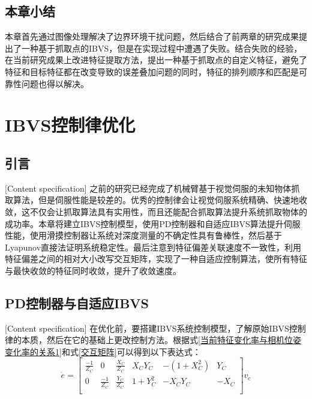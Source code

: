 \documentclass[fontset=fandol,type=bachelor,campus=harbin,bsmainpagenumberline=true]{hithesisbook}
\begin{document}
\section{本章小结}
本章首先通过图像处理解决了边界环境干扰问题，然后结合了前两章的研究成果提出了一种基于抓取点的IBVS，但是在实现过程中遭遇了失败。结合失败的经验，在当前研究成果上改进特征提取方法，提出一种基于抓取点的自定义特征，避免了特征和目标特征都在改变导致的误差叠加问题的同时，特征的排列顺序和匹配是可靠性问题也得以解决。



\chapter[IBVS控制律优化]{IBVS控制律优化}
\section{引言}[Content specification]
之前的研究已经完成了机械臂基于视觉伺服的未知物体抓取算法，但是伺服性能是较差的。优秀的控制律会让视觉伺服系统精确、快速地收敛，这不仅会让抓取算法具有实用性，而且还能配合抓取算法提升系统抓取物体的成功率。本章将建立IBVS控制模型，使用PD控制器和自适应IBVS算法\cite{mansard2007task}提升伺服性能，使用滑摸控制器让系统对深度测量的不确定性具有鲁棒性，然后基于Lyapunov直接法证明系统稳定性。最后注意到特征偏差关联速度不一致性，利用特征偏差之间的相对大小改写交互矩阵，实现了一种自适应控制算法，使所有特征与最快收敛的特征同时收敛，提升了收敛速度。


\section{PD控制器与自适应IBVS}[Content specification]
在优化前，要搭建IBVS系统控制模型，了解原始IBVS控制律的本质，然后在它的基础上更改控制方法。根据式\ref{当前特征变化率与相机位姿变化率的关系1}和式\ref{交互矩阵}可以得到以下表达式：
\begin{equation}
\dot{e}=\left[ \begin{matrix}
	\frac{-1}{Z_C}&		0&		\frac{X_C}{Z_C}&		X_CY_C&		-\left( 1+X_{C}^{2} \right)&		Y_C\\
	0&		\frac{-1}{Z_C}&		\frac{Y_C}{Z_C}&		1+Y_{C}^{2}&		-X_CY_C&		-X_C\\
\end{matrix} \right] v_c
\label{IBVS展开式}
\end{equation}
\end{document}
